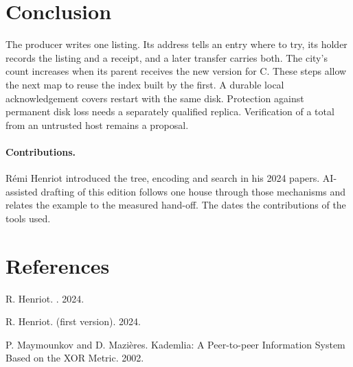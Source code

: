 \documentclass[11pt]{article}
\begin{document}
\section{Conclusion}
The producer writes one listing. Its address tells an entry where to try, its holder records the listing and a receipt, and a later transfer carries both. The city's count increases when its parent receives the new version for C. These steps allow the next map to reuse the index built by the first. A durable local acknowledgement covers restart with the same disk. Protection against permanent disk loss needs a separately qualified replica. Verification of a total from an untrusted host remains a proposal.

\paragraph{Contributions.} Rémi Henriot introduced the tree, encoding and search in his 2024 papers. AI-assisted drafting of this edition follows one house through those mechanisms and relates the example to the measured hand-off. The  dates the contributions of the tools used.

\section*{References}
\begin{enumerate}[label={[\arabic*]},leftmargin=2em,itemsep=1pt]
  \item \hypertarget{reference:1}{}R. Henriot. . 2024.
  \item \hypertarget{reference:2}{}R. Henriot.  (first version). 2024.
  \item \hypertarget{reference:3}{}P. Maymounkov and D. Mazi\`eres. Kademlia: A Peer-to-peer Information System Based on the XOR Metric. 2002.
\end{enumerate}
\end{document}
